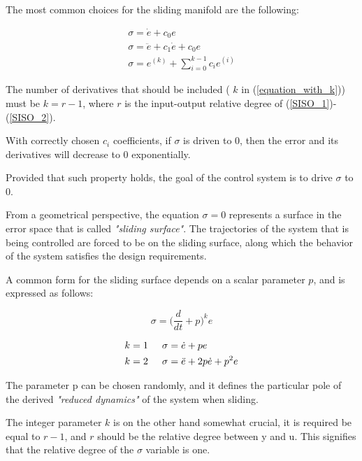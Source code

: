 \documentclass{thesisreport}
\begin{document}
The most common choices for the sliding manifold are the following:

\begin{align}
\sigma = \dot{e} + c_0 e\\
\sigma = \ddot{e} + c_1 \dot{e} + c_0 e \\
\sigma = e^{(k)} + \sum_{i=0}^{k-1} c_i e^{(i)}\label{equation_with_k}
\end{align} 



The number of derivatives that should be included ( $k$ in (\ref{equation_with_k})) must be $k=r-1$, where $r$ is the input-output relative
degree of  (\ref{SISO_1})-(\ref{SISO_2}).


With correctly chosen $c_i$ coefficients, if $\sigma$ is driven to 0, then the error and its derivatives will decrease to 0 exponentially.



Provided that such property holds, the goal of the  control system is to drive $\sigma$ to 0.


From a geometrical perspective, the equation $\sigma=0$ represents a surface in the error space that is called \textit{"sliding surface"}. The trajectories of the system that is being controlled are forced to be on the sliding surface, along which the behavior of the system satisfies the design requirements.


A common form for the sliding surface depends on a  scalar parameter $p$, and is expressed as follows:

\begin{equation}
\sigma = \bigg(\frac{d}{dt}+p\bigg)^k e
\end{equation}

\begin{align}
k&=1 \text{\hspace{0.5cm}} \sigma = \dot{e} + pe \\
k&=2 \text{\hspace{0.5cm}} \sigma = \ddot{e} + 2p \dot{e} + p^2 e
\end{align}
 
\noindent The parameter p can be chosen randomly, and it defines the particular pole of the derived \textit{"reduced dynamics"} of the system when sliding.
 

\noindent The integer parameter $k$ is on the other hand somewhat crucial, it is required be equal to $r-1$, and $r$ should be the relative
degree between y and u. This signifies that the relative degree of the $\sigma$ variable is one.
\end{document}
